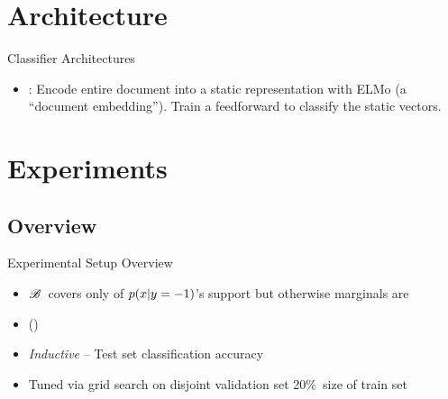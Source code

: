 \section{Architecture}
\begin{frame}{Classifier Architectures}
  \vfill
  \begin{itemize}[<+->]
    \item {}: Encode entire document into a static representation with ELMo (a ``document embedding'').  Train a feedforward to classify the static vectors.
  \end{itemize}
\end{frame}

\section{Experiments}
\subsection{Overview}
\begin{frame}{Experimental Setup Overview}
  \onslide<+->{}
  \begin{itemize}[<+->]
    \setlength{\itemsep}{6pt}
    \item $\mathscr{B}$~covers only  of ${p(x \vert y = {-}1)}$'s support but otherwise marginals are 
    \item () 
  \end{itemize}
  \vfill
  \begin{itemize}[<+->]
    \setlength{\itemsep}{6pt}
    \item \textit{Inductive} -- Test set classification accuracy
  \end{itemize}
  \vfill
  \begin{itemize}[<+->]
    \setlength{\itemsep}{6pt}
    \item Tuned via grid search on disjoint validation set 20\%~size of train set
  \end{itemize}
\end{frame}

